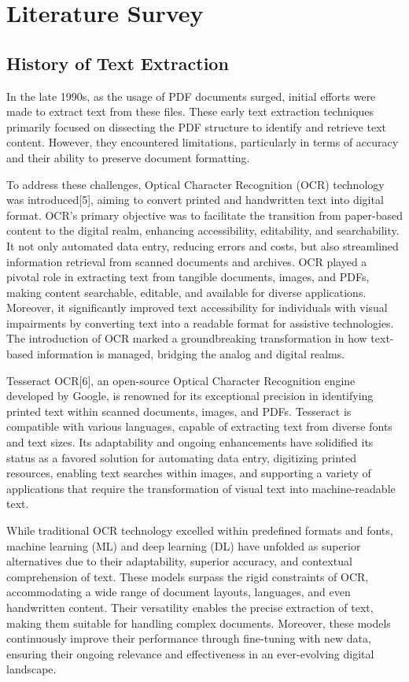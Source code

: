 \documentclass[fleqn,10pt]{thescipub} %
\begin{document}
\section{Literature Survey}

\subsection{History of Text Extraction}

In the late 1990s, as the usage of PDF documents surged, initial efforts were made to extract text from these files. These early text extraction techniques primarily focused on dissecting the PDF structure to identify and retrieve text content. However, they encountered limitations, particularly in terms of accuracy and their ability to preserve document formatting. 

To address these challenges, Optical Character Recognition (OCR) technology was introduced[5], aiming to convert printed and handwritten text into digital format. OCR's primary objective was to facilitate the transition from paper-based content to the digital realm, enhancing accessibility, editability, and searchability. It not only automated data entry, reducing errors and costs, but also streamlined information retrieval from scanned documents and archives. OCR played a pivotal role in extracting text from tangible documents, images, and PDFs, making content searchable, editable, and available for diverse applications. Moreover, it significantly improved text accessibility for individuals with visual impairments by converting text into a readable format for assistive technologies. The introduction of OCR marked a groundbreaking transformation in how text-based information is managed, bridging the analog and digital realms.

Tesseract OCR[6], an open-source Optical Character Recognition engine developed by Google, is renowned for its exceptional precision in identifying printed text within scanned documents, images, and PDFs. Tesseract is compatible with various languages, capable of extracting text from diverse fonts and text sizes. Its adaptability and ongoing enhancements have solidified its status as a favored solution for automating data entry, digitizing printed resources, enabling text searches within images, and supporting a variety of applications that require the transformation of visual text into machine-readable text.

While traditional OCR technology excelled within predefined formats and fonts, machine learning (ML) and deep learning (DL) have unfolded as superior alternatives due to their adaptability, superior accuracy, and contextual comprehension of text. These models surpass the rigid constraints of OCR, accommodating a wide range of document layouts, languages, and even handwritten content. Their versatility enables the precise extraction of text, making them suitable for handling complex documents. Moreover, these models continuously improve their performance through fine-tuning with new data, ensuring their ongoing relevance and effectiveness in an ever-evolving digital landscape.
\end{document}
